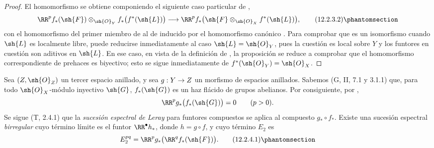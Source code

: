 \documentclass[oneside]{amsart}
\makeatletter
\newcommand{\ega@arrow}[2]{\mathchoice{#1}{#2}{#2}{#2}}
\renewcommand{\to}{\ega@arrow{\longrightarrow}{\rightarrow}}
\let\EGAOriginalLabel\label
\renewcommand{\label}[1]{\phantomsection\EGAOriginalLabel{#1}}
\makeatother
\begin{document}
\begin{proof}
El homomorfismo  se obtiene componiendo el
siguiente caso particular de ,
\[
  \RR^p f_*(\sh{F})
    \otimes_{\sh{O}_Y}f_*\bigl(f^*(\sh{L})\bigr)
  \longrightarrow
  \RR^p f_*
    \bigl(\sh{F}\otimes_{\sh{O}_X}f^*(\sh{L})\bigr),
  \tag{12.2.3.2}
  \label{0.12.2.3.2}
\]
con el homomorfismo del primer miembro de
 al de  inducido por el
homomorfismo canónico .
Para comprobar que  es un isomorfismo cuando $\sh{L}$ es
localmente libre, puede reducirse inmediatamente al caso
$\sh{L}=\sh{O}_Y$, pues la cuestión es local sobre $Y$ y los
funtores en cuestión son aditivos en $\sh{L}$.
En ese caso, en vista de la definición de , la
proposición se reduce a comprobar que el homomorfismo correspondiente
de prehaces es biyectivo; esto se sigue inmediatamente de
$f^*(\sh{O}_Y)=\sh{O}_X$.
\end{proof}

\begin{env}[12.2.4]
\label{0.12.2.4}
Sea $(Z,\sh{O}_Z)$ un tercer espacio anillado, y sea
$g:Y\to Z$ un morfismo de espacios anillados.
Sabemos (G, II, 7.1 y 3.1.1) que, para todo
$\sh{O}_X$-módulo inyectivo $\sh{G}$, $f_*(\sh{G})$ es un haz flácido de
grupos abelianos.  Por consiguiente, por ,
\[
  \RR^p g_*\bigl(f_*(\sh{G})\bigr)=0
  \qquad(p>0).
\]
Se sigue (T, 2.4.1) que la \emph{sucesión espectral de Leray} para funtores
compuestos se aplica al compuesto $g_*\circ f_*$.  Existe una
sucesión espectral \emph{birregular} cuyo término límite es el funtor
$\RR^\bullet h_*$, donde $h=g\circ f$, y cuyo término $E_2$ es
\[
  E_2^{pq}=\RR^p g_*\bigl(\RR^q f_*(\sh{F})\bigr).
  \tag{12.2.4.1}
  \label{0.12.2.4.1}
\]
\end{env}
\end{document}
